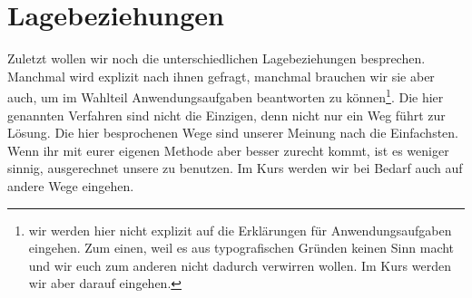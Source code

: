 \section{Lagebeziehungen}
Zuletzt wollen wir noch die unterschiedlichen Lagebeziehungen besprechen. Manchmal wird explizit nach ihnen gefragt, manchmal brauchen wir sie aber auch, um im Wahlteil Anwendungsaufgaben beantworten zu können\footnote{wir werden hier nicht explizit auf die Erklärungen für Anwendungsaufgaben eingehen. Zum einen, weil es aus typografischen Gründen keinen Sinn macht und wir euch zum anderen nicht dadurch verwirren wollen. Im Kurs werden wir aber darauf eingehen.}. Die hier genannten Verfahren sind nicht die Einzigen, denn nicht nur ein Weg führt zur Lösung. Die hier besprochenen Wege sind unserer Meinung nach die Einfachsten. Wenn ihr mit eurer eigenen Methode aber besser zurecht kommt, ist es weniger sinnig, ausgerechnet unsere zu benutzen. Im Kurs werden wir bei Bedarf auch auf andere Wege eingehen.












